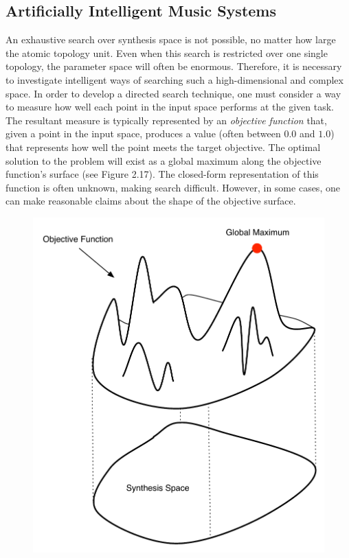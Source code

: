 \documentclass[a4paper,12pt]{report} 	%
\numberwithin{figure}{chapter}
\numberwithin{table}{chapter}
\numberwithin{equation}{chapter}
\begin{document}
\begin{flushleft}
\section{Artificially Intelligent Music Systems}
An exhaustive search over synthesis space is not possible, no matter how large the atomic topology unit. Even when this search is restricted over one single topology, the parameter space will often be enormous. Therefore, it is necessary to investigate intelligent ways of searching such a high-dimensional and complex space. In order to develop a directed search technique, one must consider a way to measure how well each point in the input space performs at the given task. The resultant measure is typically represented by an \emph{objective function} that, given a point in the input space, produces a value (often between $0.0$ and $1.0$) that represents how well the point meets the target objective. The optimal solution to the problem will exist as a global maximum along the objective function's surface (see Figure 2.17). The closed-form representation of this function is often unknown, making search difficult. However, in some cases, one can make reasonable claims about the shape of the objective surface.
\\
\begin{figure}[h!]
\begin{center}
\includegraphics[scale=0.7]{FitnessFunction}

\end{center}
\end{figure}
\end{flushleft}
\end{document}
